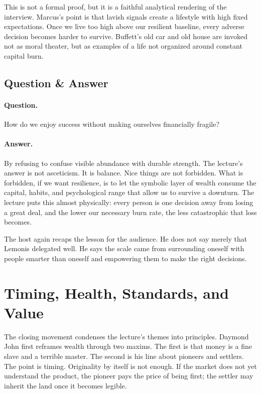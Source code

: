 This is not a formal proof, but it is a faithful analytical rendering of the interview. Marcus's point is that lavish signals create a lifestyle with high fixed expectations. Once we live too high above our resilient baseline, every adverse decision becomes harder to survive. Buffett's old car and old house are invoked not as moral theater, but as examples of a life not organized around constant capital burn.

\subsection{Question \& Answer}

\paragraph{Question.} How do we enjoy success without making ourselves financially fragile?

\paragraph{Answer.} By refusing to confuse visible abundance with durable strength. The lecture's answer is not asceticism. It is balance. Nice things are not forbidden. What is forbidden, if we want resilience, is to let the symbolic layer of wealth consume the capital, habits, and psychological range that allow us to survive a downturn. The lecture puts this almost physically: every person is one decision away from losing a great deal, and the lower our necessary burn rate, the less catastrophic that loss becomes.

The host again recaps the lesson for the audience. He does not say merely that Lemonis delegated well. He says the scale came from surrounding oneself with people smarter than oneself and empowering them to make the right decisions.

\section{Timing, Health, Standards, and Value}

The closing movement condenses the lecture's themes into principles. Daymond John first reframes wealth through two maxims. The first is that money is a fine slave and a terrible master. The second is his line about pioneers and settlers. The point is timing. Originality by itself is not enough. If the market does not yet understand the product, the pioneer pays the price of being first; the settler may inherit the land once it becomes legible.

